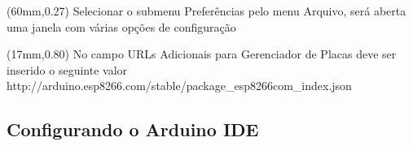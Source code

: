 \documentclass{beamer}
\begin{document}
\begin{frame}[fragile]
\begin{textblock*}{50mm}(60mm,0.27\textheight)
    Selecionar o submenu Preferências pelo menu Arquivo, será aberta uma janela com várias opções de configuração
\end{textblock*}


\begin{textblock*}{40mm}(17mm,0.80\textheight)
    No campo URLs Adicionais para Gerenciador de Placas deve ser inserido o seguinte valor
    http://arduino.esp8266.com/stable/package\_esp8266com\_index.json
\end{textblock*}


\end{frame}

\subsection{Configurando o Arduino IDE}
\end{document}
